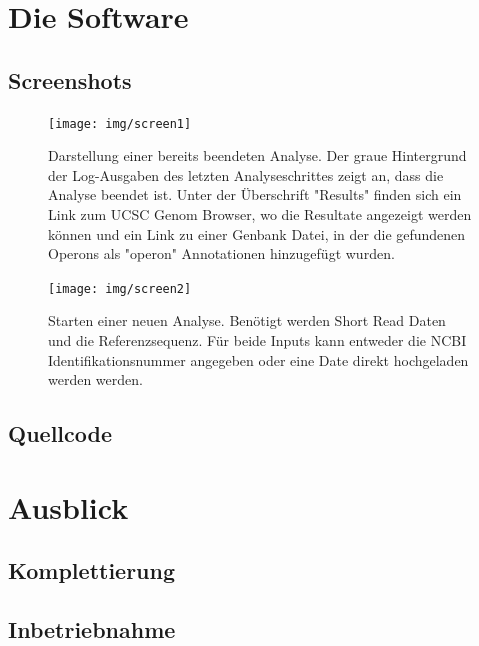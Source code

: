 \documentclass[a4paper]{thesis}
\begin{document}
\section{Die Software}

\subsection{Screenshots}

\begin{figure}[h]
\texttt{[image: img/screen1]}
\label{fig:screen1}
\caption[Screenshot 1]{
	Darstellung einer bereits beendeten Analyse. Der graue Hintergrund
	der Log-Ausgaben des letzten Analyseschrittes zeigt an, dass die
	Analyse beendet ist. Unter der Überschrift "Results" finden sich
	ein Link zum UCSC Genom Browser, wo die Resultate angezeigt werden
	können und ein Link zu einer Genbank Datei, in der die gefundenen
	Operons als "operon" Annotationen hinzugefügt wurden.
}

\end{figure}
\begin{figure}[h]
\texttt{[image: img/screen2]}
\label{fig:screen2}
\caption[Screenshot 2]{
	Starten einer neuen Analyse. Benötigt werden Short Read Daten und
	die Referenzsequenz. Für beide Inputs kann entweder die NCBI
	Identifikationsnummer angegeben oder eine Date direkt
	hochgeladen werden werden.
}
\end{figure}

\subsection{Quellcode}


\paragraphmark{}

\section{Ausblick}

\subsection{Komplettierung}

\subsection{Inbetriebnahme}
\end{document}
